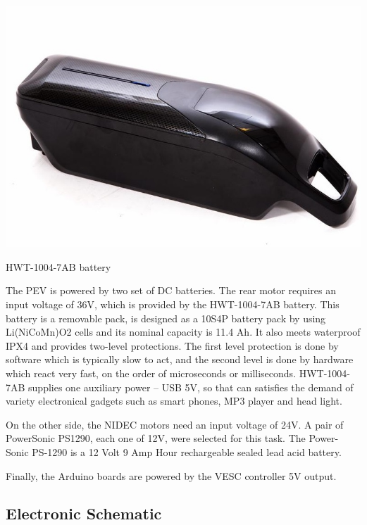 \begin{marginfigure}[2cm]
	\includegraphics[width=1\linewidth]{figs/05/battery}
	\caption{HWT-1004-7AB battery}
\end{marginfigure}
The PEV is powered by two set of DC batteries. The rear motor requires an input voltage of 36V, which is provided by the HWT-1004-7AB battery. This battery is a removable pack, is designed as a 10S4P battery pack by using Li(NiCoMn)O2 cells and its nominal capacity is 11.4 Ah. It also meets waterproof IPX4 and provides two-level protections. The first level protection is done by software which is typically slow to act, and the second level is done by hardware which react very fast, on the order of microseconds or milliseconds.
HWT-1004-7AB supplies one auxiliary power – USB 5V, so that can satisfies the demand of variety electronical gadgets such as smart phones, MP3 player and head light. 

On the other side, the NIDEC motors need an input voltage of 24V. A pair of PowerSonic PS1290, each one of 12V, were selected for this task. The Power-Sonic PS-1290 is a 12 Volt 9 Amp Hour rechargeable sealed lead acid battery. 

Finally, the Arduino boards are powered by the VESC controller 5V output.

\subsection{Electronic Schematic}

